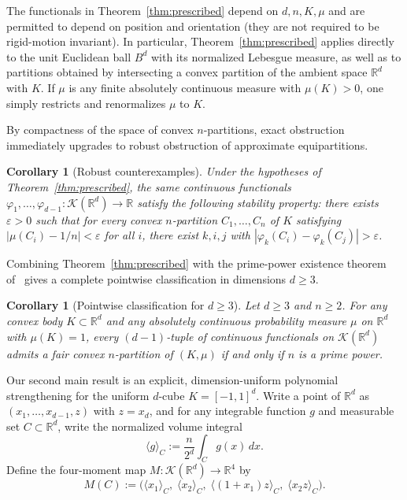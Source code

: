 \documentclass[11pt,a4paper]{amsart}
\numberwithin{equation}{section}
\newtheorem{corollary}[theorem]{Corollary}
\theoremstyle{definition}
\newcommand{\R}{\mathbb{R}}
\newcommand{\Kcal}{\mathcal{K}}
\newcommand{\avg}[2]{\langle #1 \rangle_{#2}}
\begin{document}
The functionals in Theorem~\ref{thm:prescribed} depend on $d, n, K, \mu$ and are permitted to depend on position and orientation (they are not required to be rigid-motion invariant). In particular, Theorem~\ref{thm:prescribed} applies directly to the unit Euclidean ball $B^d$ with its normalized Lebesgue measure, as well as to partitions obtained by intersecting a convex partition of the ambient space $\R^d$ with $K$. If $\mu$ is any finite absolutely continuous measure with $\mu(K) > 0$, one simply restricts and renormalizes $\mu$ to $K$.

By compactness of the space of convex $n$-partitions, exact obstruction immediately upgrades to robust obstruction of approximate equipartitions.

\begin{corollary}[Robust counterexamples]
\label{cor:robust}
Under the hypotheses of Theorem~\ref{thm:prescribed}, the same continuous functionals $\varphi_1, \dots, \varphi_{d-1} : \Kcal(\R^d) \to \R$ satisfy the following stability property: there exists $\varepsilon > 0$ such that for every convex $n$-partition $C_1, \dots, C_n$ of $K$ satisfying $|\mu(C_i) - 1/n| < \varepsilon$ for all $i$, there exist $k, i, j$ with $|\varphi_k(C_i) - \varphi_k(C_j)| > \varepsilon$.
\end{corollary}

Combining Theorem~\ref{thm:prescribed} with the prime-power existence theorem of~\cite{KHA2014,BZ2014} gives a complete pointwise classification in dimensions $d \ge 3$.

\begin{corollary}[Pointwise classification for $d \ge 3$]
\label{cor:classification}
Let $d \ge 3$ and $n \ge 2$. For any convex body $K \subset \R^d$ and any absolutely continuous probability measure $\mu$ on $\R^d$ with $\mu(K) = 1$, every $(d-1)$-tuple of continuous functionals on $\Kcal(\R^d)$ admits a fair convex $n$-partition of $(K,\mu)$ if and only if $n$ is a prime power.
\end{corollary}

Our second main result is an explicit, dimension-uniform polynomial strengthening for the uniform $d$-cube $K = [-1,1]^d$. Write a point of $\R^d$ as $(x_1, \dots, x_{d-1}, z)$ with $z = x_d$, and for any integrable function $g$ and measurable set $C \subset \R^d$, write the normalized volume integral
\[
\avg{g}{C} := \frac{n}{2^d} \int_C g(x)\,dx.
\]
Define the four-moment map $M : \Kcal(\R^d) \to \R^4$ by
\begin{equation}
\label{eq:four-moments}
M(C) := \bigl(\avg{x_1}{C},\; \avg{x_2}{C},\; \avg{(1+x_1)z}{C},\; \avg{x_2 z}{C}\bigr).
\end{equation}
\end{document}
